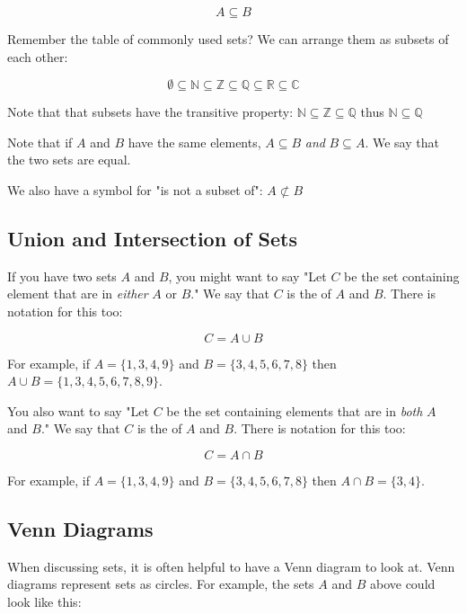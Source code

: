 $$ A \subseteq B$$

Remember the table of commonly used sets?  We can arrange them as
subsets of each other:

$$\emptyset \subseteq \mathbb{N} \subseteq \mathbb{Z} \subseteq \mathbb{Q} \subseteq \mathbb{R} \subseteq \mathbb{C}$$

Note that that subsets have the transitive property: $\mathbb{N}
\subseteq \mathbb{Z} \subseteq \mathbb{Q}$ thus $\mathbb{N} \subseteq
\mathbb{Q}$

Note that if $A$ and $B$ have the same elements, $A \subseteq B$
\textit{ and } $B \subseteq A$.  We say that the two sets are equal.

We also have a symbol for "is not a subset of": $A \not\subset B$

\subsection{Union and Intersection of Sets}

If you have two sets $A$ and $B$, you might want to say "Let $C$ be
the set containing element that are in \textit{either} $A$ or $B$."
We say that $C$ is the  of $A$ and $B$.  There is
notation for this too:

$$C = A \cup B$$

For example,  if $A = \{1,3,4,9\}$ and $B = \{3,4,5,6,7,8\}$  then $A \cup B =  \{1,3,4,5,6,7,8,9\}$.

You also want to say "Let $C$ be the set containing elements that are
in \textit{both} $A$ and $B$."  We say that $C$ is the
 of $A$ and $B$.  There is notation for this
too:

$$C = A \cap B$$

For example,  if $A = \{1,3,4,9\}$ and $B = \{3,4,5,6,7,8\}$  then $A \cap B =  \{3,4\}$.

\subsection{Venn Diagrams}

When discussing sets, it is often helpful to have a Venn diagram to
look at.  Venn diagrams represent sets as circles. For example, the
sets $A$ and $B$ above could look like this:


